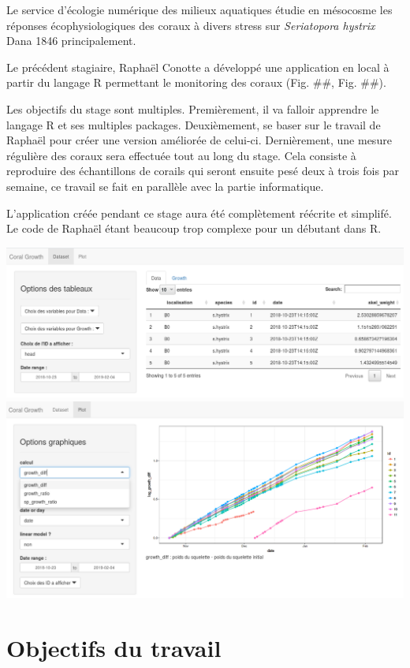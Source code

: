 \documentclass[]{report}
\begin{document}
Le service d'écologie numérique des milieux aquatiques étudie en
mésocosme les réponses écophysiologiques des coraux à divers stress sur
\emph{Seriatopora hystrix} Dana 1846 principalement.

Le précédent stagiaire, Raphaël Conotte a développé une application en
local à partir du langage R permettant le monitoring des coraux (Fig.
\#\#, Fig. \#\#).

Les objectifs du stage sont multiples. Premièrement, il va falloir
apprendre le langage R et ses multiples packages. Deuxièmement, se baser
sur le travail de Raphaël pour créer une version améliorée de celui-ci.
Dernièrement, une mesure régulière des coraux sera effectuée tout au
long du stage. Cela consiste à reproduire des échantillons de corails
qui seront ensuite pesé deux à trois fois par semaine, ce travail se
fait en parallèle avec la partie informatique.

L'application créée pendant ce stage aura été complètement réécrite et
simplifé. Le code de Raphaël étant beaucoup trop complexe pour un
débutant dans R.

\includegraphics{../image/raphael1.png}
\includegraphics{../image/raphael2.png}

\chapter{Objectifs du travail}\label{objectifs-du-travail}
\end{document}
